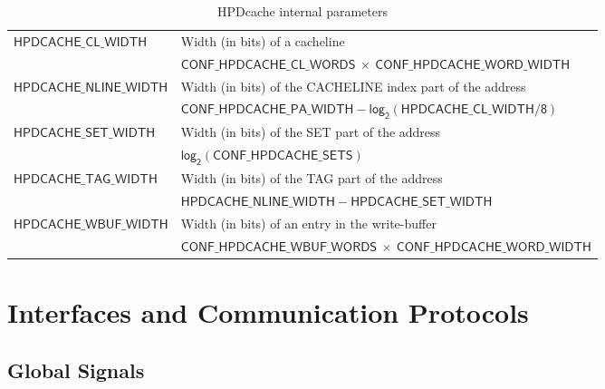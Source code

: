 \documentclass[10pt,titlepage,twoside]{book}
\begin{document}
\begin{table}[h!]
\begin{center}
\caption{HPDcache internal parameters}%
{\footnotesize%
\begin{tabular}{p{}p{}}
\toprule%
\multirow{2}{*}{$\mathsf{HPDCACHE\_CL\_WIDTH}$}%
& Width (in bits) of a cacheline\\%
& $\mathsf{CONF\_HPDCACHE\_CL\_WORDS~\times~CONF\_HPDCACHE\_WORD\_WIDTH}$\\
\midrule%
\multirow{2}{*}{$\mathsf{HPDCACHE\_NLINE\_WIDTH}$}%
& Width (in bits) of the CACHELINE index part of the address\\%
& $\mathsf{CONF\_HPDCACHE\_PA\_WIDTH - log_2(HPDCACHE\_CL\_WIDTH/8)}$\\
\midrule%
\multirow{2}{*}{$\mathsf{HPDCACHE\_SET\_WIDTH}$}%
& Width (in bits) of the SET part of the address \\%
& $\mathsf{log_2(CONF\_HPDCACHE\_SETS)}$ \\
\midrule%
\multirow{2}{*}{$\mathsf{HPDCACHE\_TAG\_WIDTH}$}%
& Width (in bits) of the TAG part of the address\\%
& $\mathsf{HPDCACHE\_NLINE\_WIDTH - HPDCACHE\_SET\_WIDTH}$\\
\midrule%
\multirow{2}{*}{$\mathsf{HPDCACHE\_WBUF\_WIDTH}$}%
& Width (in bits) of an entry in the write-buffer\\%
& $\mathsf{CONF\_HPDCACHE\_WBUF\_WORDS~\times~CONF\_HPDCACHE\_WORD\_WIDTH}$\\
\end{tabular}}
\end{center}
\end{table}


\chapter{Interfaces and Communication Protocols}
\minitoc
\newpage

\section{Global Signals}
\end{document}
